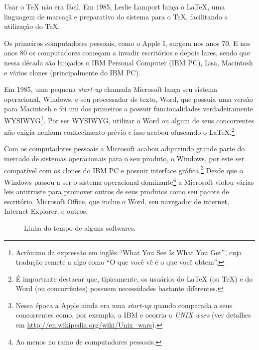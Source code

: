 Usar o TeX n\~{a}o era f\'{a}cil. Em 1985, Leslie Lamport lan\c{c}a o LaTeX, uma linguagem de marca\c{c}\~{a} e preparativo do sistema para o TeX, facilitando a utiliza\c{c}\~{a}o do TeX.\nocite{Wikipedia:EN:LaTeX}

Os primeiros computadores pessoais, como o Apple I, surgem nos anos 70. E nos anos 80 os computadores come\c{c}am a invadir escrit\'{o}rios e depois lares, sendo que nessa d\'{e}cada s\~{a}o lan\c{c}ados o IBM Personal Computer (IBM PC), Lisa, Macintosh e v\'{a}rios clones (principalmente do IBM PC).

Em 1985, uma pequena \textit{start-up} chamada Microsoft lan\c{c}a seu sistema operacional, Windows, e seu processador de texto, Word, que possuia uma vers\~{a}o para Macintosh e foi um dos primeiros a possuir funcionalidades verdadeiramente WYSIWYG\footnote{Acr\^{o}nimo da express\~{a}o em ingl\^{e}s ``What You See Is What You Get'', cuja tradu\c{c}\~{a}o remete a algo como ``O que voc\^{e} v\^{e} \'{e} o que voc\^{e} obtem''.}. Por ser WYSIWYG,  utilizar o Word ou algum de seus concorrentes n\~{a}o exigia nenhum conhecimento pr\'{e}vio e isso acabou ofuscando o LaTeX.\footnote{\'{E} importante destacar que, tipicamente, os usu\'{a}rios do LaTeX (ou TeX) e do Word (ou concorr\^{e}ntes) possuem necessidades bastante diferentes.}

Com os computadores pessoais a Microsoft acabou adquirindo grande parte do mercado de sistemas operacionais para o seu produto, o Windows, por este ser compat\'{i}vel com os clones do IBM PC e possuir interface gr\'{a}fica.\footnote{Nessa \'{e}poca a Apple ainda era uma \textit{start-up} quando comparada a seus concorrentes como, por exemplo, a IBM e ocorria a \textit{UNIX wars} (ver detalhes em \url{http://en.wikipedia.org/wiki/Unix_wars}).} Desde que o Windows passou a ser o sistema operacional dominante\footnote{Ao menos no ramo de computadores pessoais.} a Microsoft violou v\'{a}rias leis antitruste para promover outros de seus produtos como seu pacote de escrit\'{o}rio, Microsoft Office, que inclue o Word, seu navegador de internet, Internet Explorer, e outros.

\begin{figure}[htb]
    \begin{center}
        
    \end{center}
    \caption{Linha do tempo de alguns softwares.}
    \label{fig:history_timeline}
\end{figure}
